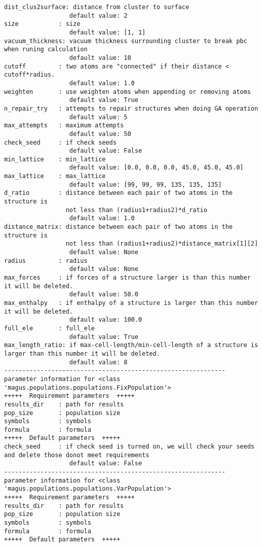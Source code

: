 \documentclass[12pt,oneside]{book}
\begin{document}
\begin{tcolorbox}
\begin{verbatim}
dist_clus2surface: distance from cluster to surface
                  default value: 2
size           : size
                  default value: [1, 1]
vacuum_thickness: vacuum thickness surrounding cluster to break pbc when runing calculation
                  default value: 10
cutoff         : two atoms are "connected" if their distance < cutoff*radius.
                  default value: 1.0
weighten       : use weighten atoms when appending or removing atoms
                  default value: True
n_repair_try   : attempts to repair structures when doing GA operation
                  default value: 5
max_attempts   : maximum attempts
                  default value: 50
check_seed     : if check seeds
                  default value: False
min_lattice    : min_lattice
                  default value: [0.0, 0.0, 0.0, 45.0, 45.0, 45.0]
max_lattice    : max_lattice
                  default value: [99, 99, 99, 135, 135, 135]
d_ratio        : distance between each pair of two atoms in the structure is
                 not less than (radius1+radius2)*d_ratio
                  default value: 1.0
distance_matrix: distance between each pair of two atoms in the structure is
                 not less than (radius1+radius2)*distance_matrix[1][2]
                  default value: None
radius         : radius
                  default value: None
max_forces     : if forces of a structure larger is than this number it will be deleted.
                  default value: 50.0
max_enthalpy   : if enthalpy of a structure is larger than this number it will be deleted.
                  default value: 100.0
full_ele       : full_ele
                  default value: True
max_length_ratio: if max-cell-length/min-cell-length of a structure is larger than this number it will be deleted.
                  default value: 8
-------------------------------------------------------------
parameter information for <class 'magus.populations.populations.FixPopulation'>
+++++  Requirement parameters  +++++
results_dir    : path for results
pop_size       : population size
symbols        : symbols
formula        : formula
+++++  Default parameters  +++++
check_seed     : if check seed is turned on, we will check your seeds and delete those donot meet requirements
                  default value: False
-------------------------------------------------------------
parameter information for <class 'magus.populations.populations.VarPopulation'>
+++++  Requirement parameters  +++++
results_dir    : path for results
pop_size       : population size
symbols        : symbols
formula        : formula
+++++  Default parameters  +++++

\end{verbatim}
\end{tcolorbox}
\end{document}
